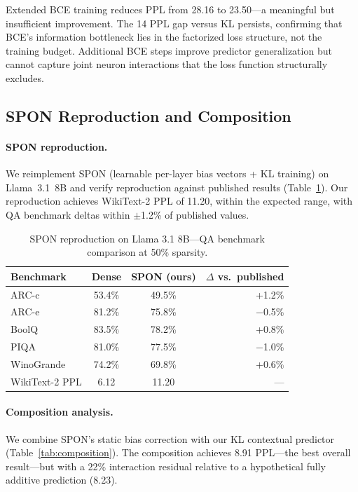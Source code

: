 \documentclass[11pt]{article}
\begin{document}
Extended BCE training reduces PPL from 28.16 to 23.50---a meaningful but insufficient improvement. The 14 PPL gap versus KL persists, confirming that BCE's information bottleneck lies in the factorized loss structure, not the training budget. Additional BCE steps improve predictor generalization but cannot capture joint neuron interactions that the loss function structurally excludes.

\subsection{SPON Reproduction and Composition}
\label{sec:composition}

\paragraph{SPON reproduction.}
We reimplement SPON (learnable per-layer bias vectors + KL training) on Llama~3.1~8B and verify reproduction against published results (Table~\ref{tab:spon_repro}). Our reproduction achieves WikiText-2 PPL of 11.20, within the expected range, with QA benchmark deltas within $\pm$1.2\% of published values.

\begin{table}[t]
\centering
\caption{SPON reproduction on Llama 3.1 8B---QA benchmark comparison at 50\% sparsity.}
\label{tab:spon_repro}
\small
\begin{tabular}{lccr}
\toprule
Benchmark & Dense & SPON (ours) & $\Delta$ vs.\ published \\
\midrule
ARC-c & 53.4\% & 49.5\% & +1.2\% \\
ARC-e & 81.2\% & 75.8\% & $-$0.5\% \\
BoolQ & 83.5\% & 78.2\% & +0.8\% \\
PIQA & 81.0\% & 77.5\% & $-$1.0\% \\
WinoGrande & 74.2\% & 69.8\% & +0.6\% \\
\midrule
WikiText-2 PPL & 6.12 & 11.20 & --- \\
\bottomrule
\end{tabular}
\end{table}

\paragraph{Composition analysis.}
We combine SPON's static bias correction with our KL contextual predictor (Table~\ref{tab:composition}). The composition achieves 8.91 PPL---the best overall result---but with a 22\% interaction residual relative to a hypothetical fully additive prediction (8.23).
\end{document}
